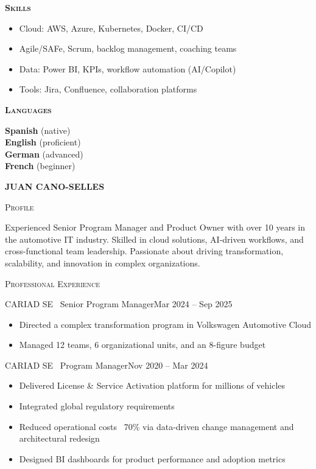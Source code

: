 \documentclass[11pt, a4paper]{article}
\newcommand{\headleft}[1]{\vspace*{2ex}\textsc{\textbf{\color{softwhite}#1}}\par%
  \vspace*{-1.2ex}{\color{softwhite}\hrulefill}\par\vspace*{0.7ex}}
\newcommand{\headright}[1]{\vspace*{2ex}\textsc{\large\color{cvblue}#1}\par%
  \vspace*{-1.4ex}{\color{cvblue}\hrulefill}\par}
\newlength{\SideBarW}
\newlength{\TitleBulletGap}     %
\newlength{\BetweenJobsGap}     %
\newenvironment{job}[3]{%
  \vspace{\BetweenJobsGap}%
  \noindent\textsc{#1} \textemdash\ #2\hfill #3\\[-\TitleBulletGap]%
  \begin{itemize}[leftmargin=1.4em,label=--,labelsep=0.5em,itemsep=0.45ex,topsep=0.2ex]
}{%
  \end{itemize}%
}
\begin{document}
\begin{minipage}{\textwidth}
{{\begin{minipage}[t]{\dimexpr\linewidth-8mm\relax}
      \headleft{Skills}
      \begin{itemize}[leftmargin=*, itemsep=0.5ex]
        \item Cloud: AWS, Azure, Kubernetes, Docker, CI/CD
        \item Agile/SAFe, Scrum, backlog management, coaching teams
        \item Data: Power BI, KPIs, workflow automation (AI/Copilot)
        \item Tools: Jira, Confluence, collaboration platforms
      \end{itemize}

      \headleft{Languages}
      \textbf{Spanish} (native) \\[0.5ex]
      \textbf{English} (proficient) \\[0.5ex]
      \textbf{German} (advanced) \\[0.5ex]
      \textbf{French} (beginner)
    \end{minipage}
  }%
}%
\hspace{3mm}%
\begin{minipage}[t]{\dimexpr\textwidth-\SideBarW-3mm\relax}
  \setlength{\parskip}{0.8ex}
  \setlength{\leftskip}{4mm}
  \setlength{\rightskip}{6mm}

  \vspace*{6mm}
  {\fontsize{28}{30}\sffont\bfseries\MakeUppercase{\textcolor{cvblue}{Juan Cano-Selles}}}\par
  \vspace*{1.0ex}

  \headright{Profile}
  Experienced Senior Program Manager and Product Owner with over 10 years in the automotive IT industry. Skilled in cloud solutions, AI-driven workflows, and cross-functional team leadership. Passionate about driving transformation, scalability, and innovation in complex organizations.

  \headright{Professional Experience}

  \begin{job}{CARIAD SE}{Senior Program Manager}{Mar 2024 -- Sep 2025}
    \item Directed a complex transformation program in Volkswagen Automotive Cloud
    \item Managed 12 teams, 6 organizational units, and an 8-figure budget
  \end{job}

  \begin{job}{CARIAD SE}{Program Manager}{Nov 2020 -- Mar 2024}
    \item Delivered License \& Service Activation platform for millions of vehicles
    \item Integrated global regulatory requirements
    \item Reduced operational costs ~70\% via data-driven change management and architectural redesign
    \item Designed BI dashboards for product performance and adoption metrics
  \end{job}


\end{minipage}
\end{minipage}
\end{document}
